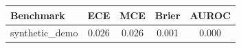 \begin{tabular}{lcccc}
\toprule
Benchmark & ECE & MCE & Brier & AUROC \\
\midrule
synthetic_demo & 0.026 & 0.026 & 0.001 & 0.000 \\
\bottomrule
\end{tabular}
